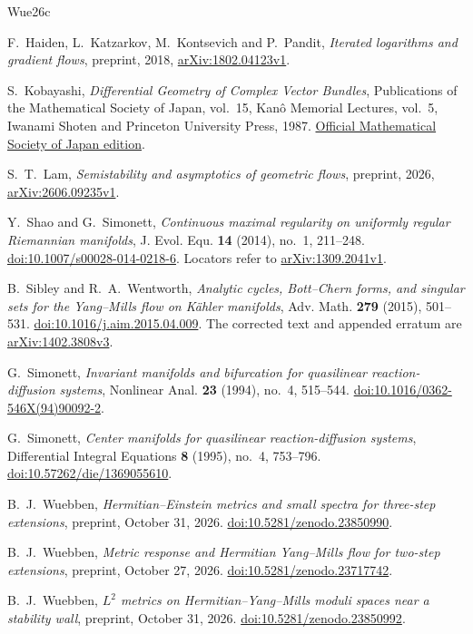 \documentclass[11pt]{amsart}
\theoremstyle{definition}
\theoremstyle{remark}
\begin{document}
\FloatBarrier
\begin{thebibliography}{Wue26c}

F.~Haiden, L.~Katzarkov, M.~Kontsevich and P.~Pandit,
\emph{Iterated logarithms and gradient flows}, preprint, 2018,
\href{https://arxiv.org/abs/1802.04123v1}{arXiv:1802.04123v1}.

S.~Kobayashi, \emph{Differential Geometry of Complex Vector Bundles},
Publications of the Mathematical Society of Japan, vol.~15,
Kan\^o Memorial Lectures, vol.~5, Iwanami Shoten and Princeton
University Press, 1987.
\href{https://www.mathsoc.jp/assets/pdf/publications/pubmsj/Vol15.pdf}
{Official Mathematical Society of Japan edition}.

S.~T.~Lam, \emph{Semistability and asymptotics of geometric flows},
preprint, 2026,
\href{https://arxiv.org/abs/2606.09235v1}{arXiv:2606.09235v1}.

Y.~Shao and G.~Simonett,
\emph{Continuous maximal regularity on uniformly regular
Riemannian manifolds}, J. Evol. Equ. \textbf{14} (2014), no.~1,
211--248.
\href{https://doi.org/10.1007/s00028-014-0218-6}
{doi:10.1007/s00028-014-0218-6}.
Locators refer to
\href{https://arxiv.org/abs/1309.2041v1}{arXiv:1309.2041v1}.

B.~Sibley and R.~A.~Wentworth,
\emph{Analytic cycles, Bott--Chern forms, and singular sets for
the Yang--Mills flow on K\"ahler manifolds},
Adv. Math. \textbf{279} (2015), 501--531.
\href{https://doi.org/10.1016/j.aim.2015.04.009}
{doi:10.1016/j.aim.2015.04.009}.
The corrected text and appended erratum are
\href{https://arxiv.org/abs/1402.3808v3}{arXiv:1402.3808v3}.

G.~Simonett, \emph{Invariant manifolds and bifurcation for
quasilinear reaction-diffusion systems}, Nonlinear Anal.
\textbf{23} (1994), no.~4, 515--544.
\href{https://doi.org/10.1016/0362-546X(94)90092-2}
{doi:10.1016/0362-546X(94)90092-2}.

G.~Simonett, \emph{Center manifolds for quasilinear
reaction-diffusion systems}, Differential Integral Equations
\textbf{8} (1995), no.~4, 753--796.
\href{https://doi.org/10.57262/die/1369055610}
{doi:10.57262/die/1369055610}.

B.~J.~Wuebben, \emph{Hermitian--Einstein metrics and small spectra
for three-step extensions}, preprint, October 31, 2026.
\href{https://doi.org/10.5281/zenodo.23850990}{doi:10.5281/zenodo.23850990}.

B.~J.~Wuebben, \emph{Metric response and Hermitian Yang--Mills
flow for two-step extensions}, preprint, October 27, 2026.
\href{https://doi.org/10.5281/zenodo.23717742}
{doi:10.5281/zenodo.23717742}.

B.~J.~Wuebben, \emph{$L^2$ metrics on Hermitian--Yang--Mills moduli spaces near a stability wall},
preprint, October 31, 2026.
\href{https://doi.org/10.5281/zenodo.23850992}{doi:10.5281/zenodo.23850992}.

\end{thebibliography}
\end{document}
